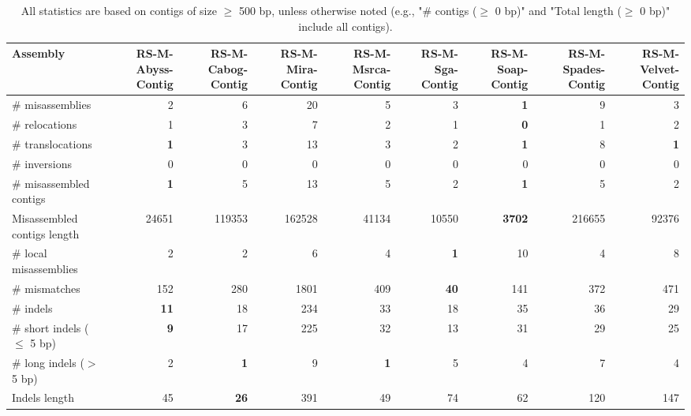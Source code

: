 \documentclass[12pt,a4paper]{article}
\begin{document}
\begin{table}[ht]
\begin{center}
\caption{All statistics are based on contigs of size $\geq$ 500 bp, unless otherwise noted (e.g., "\# contigs ($\geq$ 0 bp)" and "Total length ($\geq$ 0 bp)" include all contigs).}
\begin{tabular}{|l*{8}{|r}|}
\hline
Assembly & RS-M-Abyss-Contig & RS-M-Cabog-Contig & RS-M-Mira-Contig & RS-M-Msrca-Contig & RS-M-Sga-Contig & RS-M-Soap-Contig & RS-M-Spades-Contig & RS-M-Velvet-Contig \\ \hline
\# misassemblies & 2 & 6 & 20 & 5 & 3 & {\bf 1} & 9 & 3 \\ \hline
\hspace{5mm}\# relocations & 1 & 3 & 7 & 2 & 1 & {\bf 0} & 1 & 2 \\ \hline
\hspace{5mm}\# translocations & {\bf 1} & 3 & 13 & 3 & 2 & {\bf 1} & 8 & {\bf 1} \\ \hline
\hspace{5mm}\# inversions & 0 & 0 & 0 & 0 & 0 & 0 & 0 & 0 \\ \hline
\# misassembled contigs & {\bf 1} & 5 & 13 & 5 & 2 & {\bf 1} & 5 & 2 \\ \hline
Misassembled contigs length & 24651 & 119353 & 162528 & 41134 & 10550 & {\bf 3702} & 216655 & 92376 \\ \hline
\# local misassemblies & 2 & 2 & 6 & 4 & {\bf 1} & 10 & 4 & 8 \\ \hline
\# mismatches & 152 & 280 & 1801 & 409 & {\bf 40} & 141 & 372 & 471 \\ \hline
\# indels & {\bf 11} & 18 & 234 & 33 & 18 & 35 & 36 & 29 \\ \hline
\hspace{5mm}\# short indels ($\leq$ 5 bp) & {\bf 9} & 17 & 225 & 32 & 13 & 31 & 29 & 25 \\ \hline
\hspace{5mm}\# long indels ($>$ 5 bp) & 2 & {\bf 1} & 9 & {\bf 1} & 5 & 4 & 7 & 4 \\ \hline
Indels length & 45 & {\bf 26} & 391 & 49 & 74 & 62 & 120 & 147 \\ \hline
\end{tabular}
\end{center}
\end{table}
\end{document}
